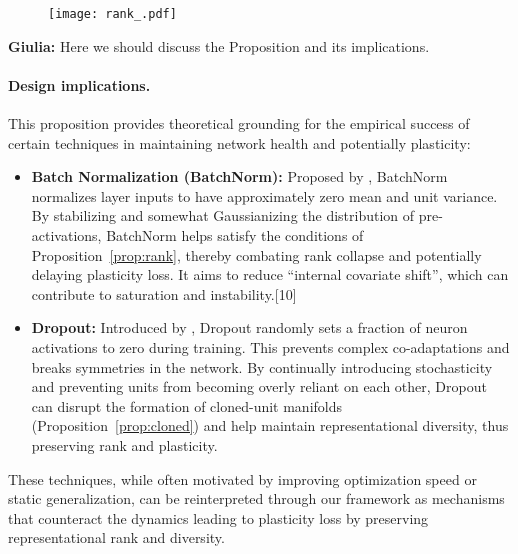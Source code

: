 \documentclass{article}
\newcommand{\giulia}[1]{{\color{ForestGreen}\textbf{Giulia:} #1}}
\begin{document}
\begin{figure}[htbp]
    \centering
    \texttt{[image: rank\_.pdf]}
    
    \caption{}
    \label{fig:eigenvalue_impact_scaling}
\end{figure}

\giulia{Here we should discuss the Proposition and its implications. }

\paragraph{Design implications.}
This proposition provides theoretical grounding for the empirical success of certain techniques in maintaining network health and potentially plasticity:
\begin{itemize}
    \item \textbf{Batch Normalization (BatchNorm):} Proposed by \cite{ioffe2015batch}, BatchNorm normalizes layer inputs to have approximately zero mean and unit variance. By stabilizing and somewhat Gaussianizing the distribution of pre-activations, BatchNorm helps satisfy the conditions of Proposition~\ref{prop:rank}, thereby combating rank collapse and potentially delaying plasticity loss. It aims to reduce ``internal covariate shift'', which can contribute to saturation and instability.[10]
    \item \textbf{Dropout:} Introduced by \cite{srivastava2014dropout}, Dropout randomly sets a fraction of neuron activations to zero during training. This prevents complex co-adaptations and breaks symmetries in the network. By continually introducing stochasticity and preventing units from becoming overly reliant on each other, Dropout can disrupt the formation of cloned-unit manifolds (Proposition~\ref{prop:cloned}) and help maintain representational diversity, thus preserving rank and plasticity.
\end{itemize}
These techniques, while often motivated by improving optimization speed or static generalization, can be reinterpreted through our framework as mechanisms that counteract the dynamics leading to plasticity loss by preserving representational rank and diversity.
\end{document}

